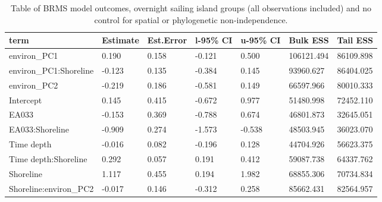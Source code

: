 \begin{table}[ht]
\centering
\begin{tabular}{p{4cm}p{1.65cm}p{1.65cm}p{1.65cm}p{1.65cm}p{1.65cm}p{1.65cm}}
  \toprule
term & Estimate & Est.Error & l-95\% CI & u-95\% CI & Bulk ESS & Tail ESS \\ 
  \midrule
environ\_PC1 & 0.190 & 0.158 & -0.121 & 0.500 & 106121.494 & 86109.898 \\ 
  environ\_PC1:Shoreline & -0.123 & 0.135 & -0.384 & 0.145 & 93960.627 & 86404.025 \\ 
  environ\_PC2 & -0.219 & 0.186 & -0.581 & 0.149 & 66597.966 & 80010.333 \\ 
  Intercept & 0.145 & 0.415 & -0.672 & 0.977 & 51480.998 & 72452.110 \\ 
  EA033 & -0.153 & 0.369 & -0.788 & 0.674 & 46801.873 & 32645.051 \\ 
  EA033:Shoreline & -0.909 & 0.274 & -1.573 & -0.538 & 48503.945 & 36023.070 \\ 
  Time depth & -0.016 & 0.082 & -0.196 & 0.128 & 44704.926 & 56623.375 \\ 
  Time depth:Shoreline & 0.292 & 0.057 & 0.191 & 0.412 & 59087.738 & 64337.762 \\ 
  Shoreline & 1.117 & 0.455 & 0.194 & 1.982 & 68855.306 & 70734.834 \\ 
  Shoreline:environ\_PC2 & -0.017 & 0.146 & -0.312 & 0.258 & 85662.431 & 82564.957 \\ 
   \bottomrule
\end{tabular}
\caption{Table of BRMS model outcomes, overnight sailing island groups (all observations included) and no control for spatial or phylogenetic non-independence.} 
\label{BRMS_effects_SBZR_control_none}
\end{table}
